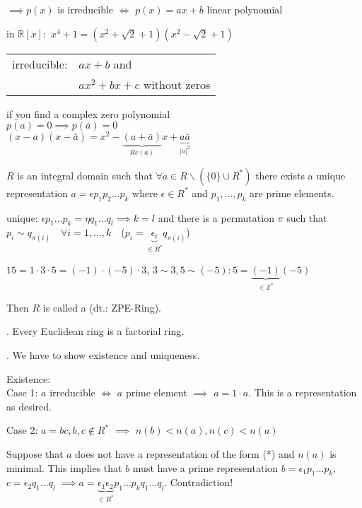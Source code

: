 $\implies p(x)$ is irreducible $\iff$ $p(x) = ax+b$ linear polynomial

in $\mathbb{R}[x]:$
$x^4 + 1 = (x^2 + \sqrt{2} +1)(x^2 - \sqrt{2} + 1)$

\begin{tabular}{ll}
  irreducible:
    & $ax+b$ and \\
    & $ax^2 + bx + c$ without zeros\\
\end{tabular}

if you find a complex zero polynomial \\
$p(a) = 0 \implies p(\bar{a}) = 0$ \\
$(x-a)(x-\bar{a}) = x^2 - \underbrace{(a + \bar{a})}_{Re(a)} x + \underbrace{a\bar{a}}_{|a|^2}$

\begin{definition}
$R$ is an integral domain such that $\forall a \in R \backslash (\{0\} \cup R^{*})$
there exists a unique representation $a = \epsilon p_1 p_2 \ldots p_k$
where $\epsilon \in R^{*}$ and $p_1, \ldots, p_k$ are prime elements.

unique: $\epsilon p_1 \ldots p_k = \eta q_1 \ldots q_l \implies k=l$ and there is a permutation $\pi$ such that
$p_i \sim q_{\pi(i)} \quad \forall i = 1,\ldots, k \quad $($ p_i = \underbrace{\epsilon_i}_{\in R^{*}} q_{\pi(i)} $)

$15 = 1\cdot 3\cdot 5 = (-1) \cdot (-5) \cdot 3$, $ 3 \sim 3, 5 \sim (-5): 5=\underbrace{(-1)}_{\in\mathbb{Z}^{*}} (-5)$

Then $R$ is called a  (dt.: ZPE-Ring).
\end{definition}

\Theorem.
Every Euclidean ring is a factorial ring.

\Proof.
We have to show existence and uniqueness.

Existence:\\
Case 1:
$a$ irreducible $\Leftrightarrow$ $a$ prime element $\implies$ $a=1\cdot a$. This is a representation as desired.

Case 2: $a= bc, b,c \not\in R^{*}$ $\implies$ $n(b) < n(a), n(c) < n(a)$

Suppose that $a$ does not have a representation of the form (*) and $n(a)$ is minimal.
This implies that $b$ must have a prime representation $b = \epsilon_1 p_1 \ldots p_k$, $c = \epsilon_2 q_1 \ldots q_l$
$\implies a = \underbrace{\epsilon_1 \epsilon_2}_{\in R^{*}} p_1 \ldots p_k q_1 \ldots q_l$. Contradiction!

